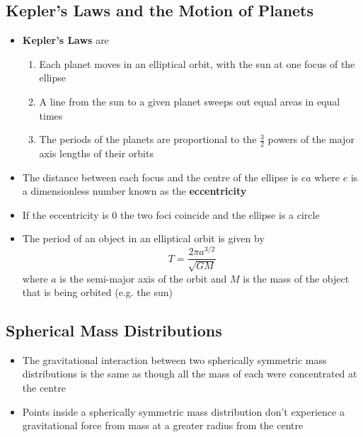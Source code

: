 \documentclass{article}
\begin{document}
\subsection{Kepler's Laws and the Motion of Planets}

\begin{itemize}
  \item \textbf{Kepler's Laws} are

        \begin{enumerate}
          \item Each planet moves in an elliptical orbit, with the sun at one focus of the ellipse

          \item A line from the sun to a given planet sweeps out equal areas in equal times

          \item The periods of the planets are proportional to the $\frac{3}{2}$ powers of the major axis lengths of their orbits
        \end{enumerate}

  \item The distance between each focus and the centre of the ellipse is $ea$ where $e$ is a dimensionless number known as the \textbf{eccentricity}

  \item If the eccentricity is 0 the two foci coincide and the ellipse is a circle

  \item The period of an object in an elliptical orbit is given by \[T = \frac {2\pi a^{3/2}}{\sqrt{GM}}\] where $a$ is the semi-major axis of the orbit and $M$ is the mass of the object that is being orbited (e.g. the sun)
\end{itemize}

\subsection{Spherical Mass Distributions}

\begin{itemize}
  \item The gravitational interaction between two spherically symmetric mass distributions is the same as though all the mass of each were concentrated at the centre

  \item Points inside a spherically symmetric mass distribution don't experience a gravitational force from mass at a greater radius from the centre
\end{itemize}
\end{document}

